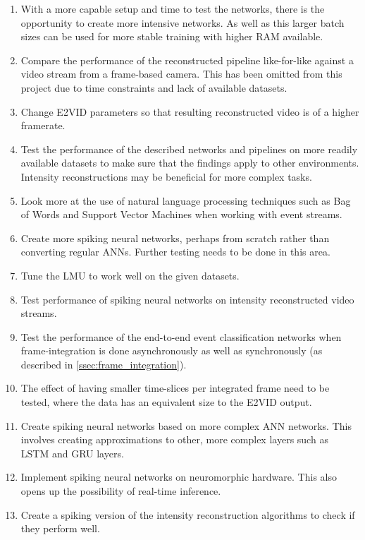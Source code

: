 \begin{enumerate}
    \item With a more capable setup and time to test the networks, there is the opportunity to create more intensive networks. As well as this larger batch sizes can be used for more stable training with higher RAM available.
    \item Compare the performance of the reconstructed pipeline like-for-like against a video stream from a frame-based camera. This has been omitted from this project due to time constraints and lack of available datasets.
    \item Change E2VID parameters so that resulting reconstructed video is of a higher framerate.
    \item Test the performance of the described networks and pipelines on more readily available datasets to make sure that the findings apply to other environments. Intensity reconstructions may be beneficial for more complex tasks.
    \item Look more at the use of natural language processing techniques such as Bag of Words and Support Vector Machines when working with event streams.
    \item Create more spiking neural networks, perhaps from scratch rather than converting regular ANNs. Further testing needs to be done in this area.
    \item Tune the LMU to work well on the given datasets.
    \item Test performance of spiking neural networks on intensity reconstructed video streams.
    \item Test the performance of the end-to-end event classification networks when frame-integration is done asynchronously as well as synchronously (as described in \cref{ssec:frame_integration}). 
    \item The effect of having smaller time-slices per integrated frame need to be tested, where the data has an equivalent size to the E2VID output.
    \item Create spiking neural networks based on more complex ANN networks. This involves creating approximations to other, more complex layers such as LSTM and GRU layers.
    \item Implement spiking neural networks on neuromorphic hardware. This also opens up the possibility of real-time inference.
    \item Create a spiking version of the intensity reconstruction algorithms to check if they perform well.
\end{enumerate}

